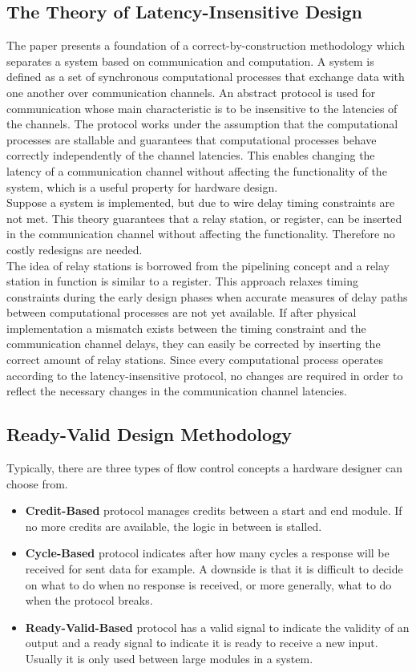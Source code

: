 \subsection{The Theory of Latency-Insensitive Design}
The paper \cite{delay-insensitive} presents a foundation of a correct-by-construction methodology which separates a system based on communication and computation. A system is defined as a set of synchronous computational processes that exchange data with one another over communication channels. An abstract protocol is used for communication whose main characteristic is to be insensitive to the latencies of the channels. The protocol works under the assumption that the computational processes are stallable and guarantees that computational processes behave correctly independently of the channel latencies. This enables changing the latency of a communication channel without affecting the functionality of the system, which is a useful property for hardware design.\\
Suppose a system is implemented, but due to wire delay timing constraints are not met. This theory guarantees that a relay station, or register, can be inserted in the communication channel without affecting the functionality. Therefore no costly redesigns are needed.\\
The idea of relay stations is borrowed from the pipelining concept and a relay station in function is similar to a register. This approach relaxes timing constraints during the early design phases when accurate measures of delay paths between computational processes are not yet available. If after physical implementation a mismatch exists between the timing constraint and the communication channel delays, they can easily be corrected by inserting the correct amount of relay stations. Since every computational process operates according to the latency-insensitive protocol, no changes are required in order to reflect the necessary changes in the communication channel latencies.



\subsection{Ready-Valid Design Methodology}
Typically, there are three types of flow control concepts a hardware designer can choose from.
\begin{itemize}
  \item{\textbf{Credit-Based} protocol manages credits between a start and end module. If no more credits are available, the logic in between is stalled.}
  \item{\textbf{Cycle-Based} protocol indicates after how many cycles a response will be received for sent data for example. A downside is that it is difficult to decide on what to do when no response is received, or more generally, what to do when the protocol breaks.}
  \item{\textbf{Ready-Valid-Based} protocol has a valid signal to indicate the validity of an output and a ready signal to indicate it is ready to receive a new input. Usually it is only used between large modules in a system.}
\end{itemize}

